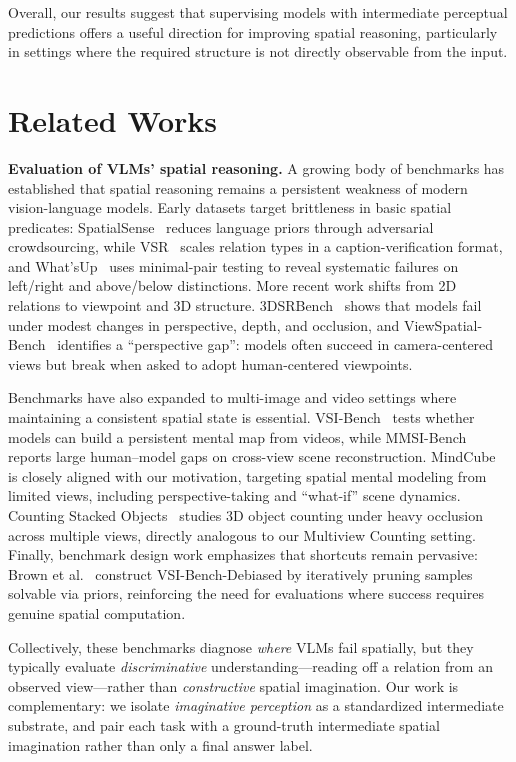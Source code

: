 \documentclass{llmxive}
\providecommand{\etal}{et al.\xspace}
\begin{document}
Overall, our results suggest that supervising models with intermediate perceptual predictions offers a useful direction for improving spatial reasoning, particularly in settings where the required structure is not directly observable from the input.


\section{Related Works}
\label{sec:rw}

\noindent\textbf{Evaluation of VLMs' spatial reasoning.}
A growing body of benchmarks has established that spatial reasoning remains a persistent weakness of modern vision-language models. Early datasets target brittleness in basic spatial predicates: SpatialSense~\cite{yang2019spatialsense} reduces language priors through adversarial crowdsourcing, while VSR~\cite{liu2022vsr} scales relation types in a caption-verification format, and What'sUp~\cite{kamath2023whatsup} uses minimal-pair testing to reveal systematic failures on left/right and above/below distinctions. More recent work shifts from 2D relations to viewpoint and 3D structure. 3DSRBench~\cite{ma20253dsrbench} shows that models fail under modest changes in perspective, depth, and occlusion, and ViewSpatial-Bench~\cite{li2025viewspatialbench} identifies a ``perspective gap'': models often succeed in camera-centered views but break when asked to adopt human-centered viewpoints.

Benchmarks have also expanded to multi-image and video settings where maintaining a consistent spatial state is essential. VSI-Bench~\cite{yang2025thinkinginspace} tests whether models can build a persistent mental map from videos, while MMSI-Bench~\cite{yang2025mmsibench} reports large human--model gaps on cross-view scene reconstruction. MindCube~\cite{yin2025mindcube} is closely aligned with our motivation, targeting spatial mental modeling from limited views, including perspective-taking and ``what-if'' scene dynamics. Counting Stacked Objects~\cite{dumery2025countingstackedobjects} studies 3D object counting under heavy occlusion across multiple views, directly analogous to our Multiview Counting setting. Finally, benchmark design work emphasizes that shortcuts remain pervasive: Brown \etal~\cite{brown2025trainontestset} construct VSI-Bench-Debiased by iteratively pruning samples solvable via priors, reinforcing the need for evaluations where success requires genuine spatial computation.

Collectively, these benchmarks diagnose \emph{where} VLMs fail spatially, but they typically evaluate \emph{discriminative} understanding---reading off a relation from an observed view---rather than \emph{constructive} spatial imagination. Our work is complementary: we isolate \emph{imaginative perception} as a standardized intermediate substrate, and pair each task with a ground-truth intermediate spatial imagination rather than only a final answer label.
\end{document}
